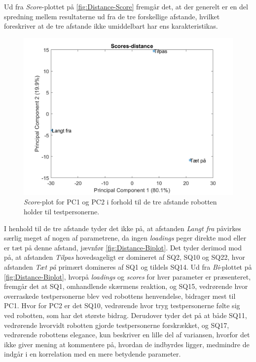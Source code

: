 \noindent
%
Ud fra \textit{Score}-plottet på \autoref{fig:Distance-Score} fremgår det, at der generelt er en del spredning mellem resultaterne ud fra de tre forskellige afstande, hvilket foreskriver at de tre afstande ikke umiddelbart har ens karakteristikas.
%
\begin{figure}[H]
\centering
\includegraphics[width=\textwidth]{Figure/DatabehandlingSkalaer/PCAfigures/Distance-Scores}
\caption{\textit{Score}-plot for PC1 og PC2 i forhold til de tre afstande robotten holder til testpersonerne.}
\label{fig:Distance-Score}
\end{figure}
\noindent
%
I henhold til de tre afstande tyder det ikke på, at afstanden \textit{Langt fra} påvirkes særlig meget af nogen af parametrene, da ingen \textit{loadings} peger direkte mod eller er tæt på denne afstand, jævnfør \autoref{fig:Distance-Biplot}. Det tyder derimod mod på, at afstanden \textit{Tilpas} hovedsageligt er domineret af SQ2, SQ10 og SQ22, hvor afstanden \textit{Tæt på} primært domineres af SQ1 og tildels SQ14.\blankline     
%
Ud fra \textit{Bi}-plottet på \autoref{fig:Distance-Biplot}, hvorpå \textit{loadings} og \textit{scores} for hver parameter er præsenteret, fremgår det at SQ1, omhandlende skærmens reaktion, og SQ15, vedrørende hvor overraskede testpersonerne blev ved robottens henvendelse, bidrager mest til PC1. Hvor for PC2 er det SQ10, vedrørende hvor tryg testpersonerne følte sig ved robotten, som har det største bidrag. Derudover tyder det på at både SQ11, vedrørende hvorvidt robotten gjorde testpersonerne forskrækket, og SQ17, vedrørende robottens elegance, kun beskriver en lille del af variansen, hvorfor det ikke giver mening at kommentere på, hvordan de indbyrdes ligger, medmindre de indgår i en korrelation med en mere betydende parameter.   
